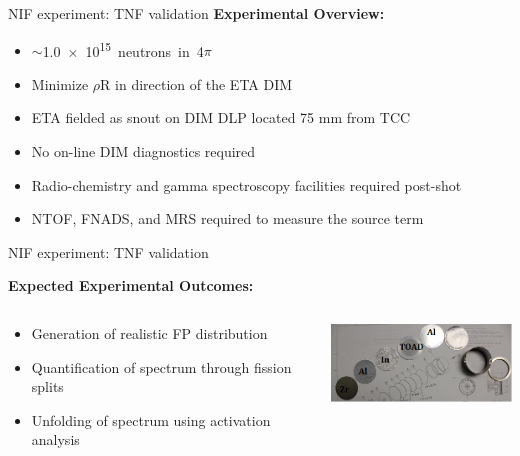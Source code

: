 \documentclass[xcolor=x11names,compress,handout]{beamer}
\renewcommand{\(}{\begin{columns}}
\renewcommand{\)}{\end{columns}}
\newcommand{\<}[1]{\begin{column}{#1}}
\renewcommand{\>}{\end{column}}
\begin{document}
\begin{frame}{NIF experiment: TNF validation}
    \textbf{Experimental Overview:}
    \begin{itemize}
      \item $\sim$\SI{1.0e+15} neutrons in 4$\pi$
      \item Minimize $\rho$R in direction of the ETA DIM 
      \item ETA fielded as snout on DIM DLP located 75 mm from TCC
          
        \vspace{-0.25cm}
  \renewcommand*{\thesubfigure}{}
  \begin{figure}[htp]
    \centering
    \subcapcentertrue
  \end{figure} 
  
        \vspace{-1.0cm}  
      \item No on-line DIM diagnostics required
      \item Radio-chemistry and gamma spectroscopy facilities required post-shot
      \item NTOF, FNADS, and MRS required to measure the source term 
    \end{itemize}
    
\end{frame}

\begin{frame}{NIF experiment: TNF validation}

    \textbf{Expected Experimental Outcomes:}
      \begin{columns}
        \begin{column}{0.5\linewidth}
          \vspace{-0.15	cm} 
          \begin{itemize}
            \item Generation of realistic FP distribution
            \item Quantification of spectrum through fission splits
            \item Unfolding of spectrum using activation analysis
          \end{itemize}
        \end{column}
        
        \begin{column}{0.5\linewidth}
          \includegraphics[width=2.0in]{../figs/NAS2.png}
        \end{column}
      \end{columns}
\end{frame}
\end{document}
